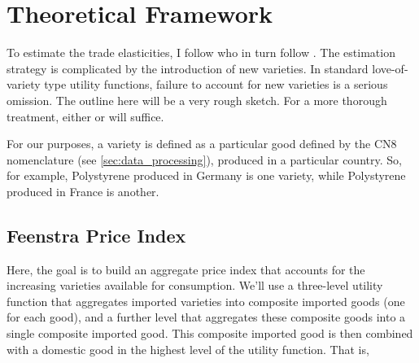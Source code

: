 \documentclass[12pt,a4paper]{article}                      %
\begin{document}



\section{Theoretical Framework}
\label{sec:theoretical_framework}

To estimate the trade elasticities, I follow \cite{broda_weinstein_2006_globalization_gains} who in turn follow \cite{feenstra_1994_new_product_varieties}.  The estimation strategy is complicated by the introduction of new varieties.  In standard love-of-variety type utility functions, failure to account for new varieties is a serious omission.  The outline here will be a very rough sketch.  For a more thorough treatment, either \cite{feenstra_1994_new_product_varieties} or \cite{broda_weinstein_2006_globalization_gains} will suffice.

For our purposes, a variety is defined as a particular good defined by the CN8 nomenclature (see \ref{sec:data_processing}), produced in a particular country.  So, for example, Polystyrene produced in Germany is one variety, while Polystyrene produced in France is another.

\subsection{Feenstra Price Index}
\label{sub:feenstra_price_index}

Here, the goal is to build an aggregate price index that accounts for the increasing varieties available for consumption.  We'll use a three-level utility function that aggregates imported varieties into composite imported goods (one for each good), and a further level that aggregates these composite goods into a single composite imported good.  This composite imported good is then combined with a domestic good in the highest level of the utility function.  That is,
\end{document}
